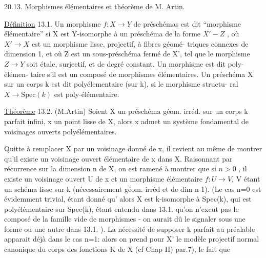 
20.13. \uline{Morphismes élémentaires et théorème de M. Artin}.

\uline{Définition} 13.1. Un morphisme $f:X\to Y$ de préschémas est dit ``morphisme
 élémentaire'' si X est  Y-isomorphe à un préschéma de la forme
$X' - Z$ , où $X'\to X$ est un morphisme lisse, projectif, à fibres géomé-%
triques connexes de dimension 1, et où Z est un sous-préschéma fermé
de X',  tel que le morphisme $Z\to Y$ soit étale, surjectif, et
de degré constant. Un morphisme est dit  poly-élémen-%
taire s'il est un composé de morphismes élémentaires. Un préschéma X
sur un corps k est dit polyélementaire (sur k), si le morphisme structu-%
ral $X\to \mathrm{Spec}(k)$ est poly-élémentaire.

\uline{Théorème} 13.2. (M.Artin) Soient X un préschéma géom. irréd. sur un corps k parfait infini, x un point lisse
de X, alors x admet un système fondamental de voisinages ouverts
polyélémentaires.

Quitte à remplacer X par un voisinage donné de x,  il revient au
 même de montrer qu'il existe un voisinage ouvert élémentaire de x dans X.
  Raisonnant par récurrence sur
la dimension n de X, on  est ramené à montrer que si $n>0$ , il existe
un voisinage ouvert U de x et un morphisme élémentaire $f: U\to V$,
V étant un schéma lisse sur k (nécessairement géom. irréd et de dim n-1).
 (Le cas n=0 est évidemment trivial, étant donné qu' alors
X est k-isomorphe à Spec(k), qui est polyélémentaire sur Spec(k), étant
entendu dans 13.1. qu'on n'excut pas le composé de la famille vide de
morphismes - on aurait dû le signaler sous une forme ou une autre dans
13.1. ). La nécessité de supposer k parfait au préalable apparait déjà
dans le cas n=1: alors on prend pour X' le modèle projectif normal
canonique du corps des fonctions K de X (cf Chap II) par.7), le fait que

